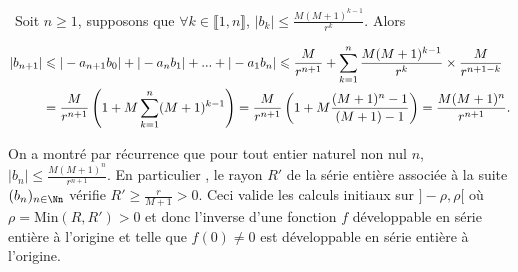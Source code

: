 {\begin{enumerate}
{\textbullet~Soit $n\geqslant1$, supposons que $\forall k\in\llbracket1,n\rrbracket$, $|b_k|\leqslant\frac{M(M+1)^{k-1}}{r^k}$. Alors 

\begin{align*}\ensuremath
\left|b_{n+1}\right|&\leqslant|-a_{n+1}b_0| +|-a_nb_1| + ...+ |-a_1b_n|\leqslant\frac{M}{r^{n+1}}+\sum_{k=1}^{n}\frac{M(M+1)^{k-1}}{r^k}\times\frac{M}{r^{n+1-k}}\\
 &=\frac{M}{r^{n+1}}\left(1+ M\sum_{k=1}^{n}(M+1)^{k-1}\right)=\frac{M}{r^{n+1}}\left(1+ M\frac{(M+1)^n-1}{(M+1)-1}\right)=\frac{M(M+1)^n}{r^{n+1}}.
\end{align*}

On a montré par récurrence que pour tout entier naturel non nul $n$, $|b_n|\leqslant\frac{M(M+1)^n}{r^{n+1}}$. En particulier , le rayon $R'$ de la série entière associée à la suite $(b_n)_{n\in\Nn}$ vérifie $R'\geqslant\frac{r}{M+1}> 0$. Ceci valide les calculs initiaux sur $]-\rho,\rho[$ où $\rho=\text{Min}(R,R')>0$ et donc l'inverse d'une fonction $f$ développable en série entière à l'origine et telle que $f(0)\neq0$ est développable en série entière à l'origine.}
\end{enumerate}
}
